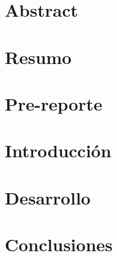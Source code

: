 \documentclass[12pt,a4paper]{article}
\begin{document}
\section{Abstract}


\section{Resumo}




\section{Pre-reporte}


\section{Introducción}


\section{Desarrollo}


\section{Conclusiones}





\nocite{*}
          
\end{document}
